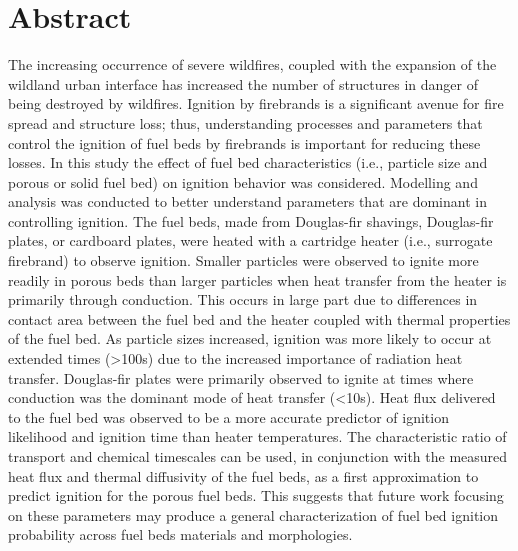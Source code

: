 \section{Abstract}
\label{sec:abstract1}
    The increasing occurrence of severe wildfires, coupled with the expansion of the wildland urban interface has increased the number of structures in danger of being destroyed by wildfires. Ignition by firebrands is a significant avenue for fire spread and structure loss; thus, understanding processes and parameters that control the ignition of fuel beds by firebrands is important for reducing these losses. In this study the effect of fuel bed characteristics (i.e., particle size and porous or solid fuel bed) on ignition behavior was considered.  Modelling and analysis was conducted to better understand parameters that are dominant in controlling ignition. The fuel beds, made from Douglas-fir shavings, Douglas-fir plates, or cardboard plates, were heated with a cartridge heater (i.e., surrogate firebrand) to observe ignition. Smaller particles were observed to ignite more readily in porous beds than larger particles when heat transfer from the heater is primarily through conduction. This occurs in large part due to differences in contact area between the fuel bed and the heater coupled  with thermal properties of the fuel bed. As particle sizes increased, ignition was more likely to occur at extended times (\textgreater 100\si{\second}) due to the increased importance of radiation heat transfer. Douglas-fir plates were primarily observed to ignite at times where conduction was the dominant mode of heat transfer (\textless 10\si{\second}). Heat flux delivered to the fuel bed was observed to be a more accurate predictor of ignition likelihood and ignition time than heater temperatures. The characteristic ratio of transport and chemical timescales can be used, in conjunction with the measured heat flux and thermal diffusivity of the fuel beds, as a first approximation to predict ignition for the porous fuel beds. This suggests that future work focusing on these parameters may produce a general characterization of fuel bed ignition probability across fuel beds materials and morphologies.  

